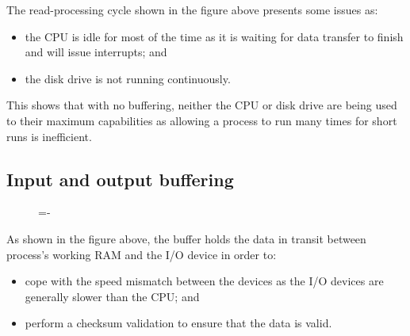 \documentclass[a4paper]{systems-software}
\begin{document}
The read-processing cycle shown in the figure above presents some issues as:
\begin{itemize}
	\item the CPU is idle for most of the time as it is waiting for data transfer to finish and will issue interrupts; and
	\item the disk drive is not running continuously.
\end{itemize}

This shows that with no buffering, neither the CPU or disk drive are being used to their maximum capabilities as allowing a process to run many times for short runs is inefficient.


\subsection*{Input and output buffering}

\begin{figure}[H]
  \lineskip=-\fboxrule
\end{figure}

As shown in the figure above, the buffer holds the data in transit between process's working RAM and the I/O device in order to:
\begin{itemize}
	\item cope with the speed mismatch between the devices as the I/O devices are generally slower than the CPU; and
	\item perform a checksum validation to ensure that the data is valid.
\end{itemize}
\end{document}
